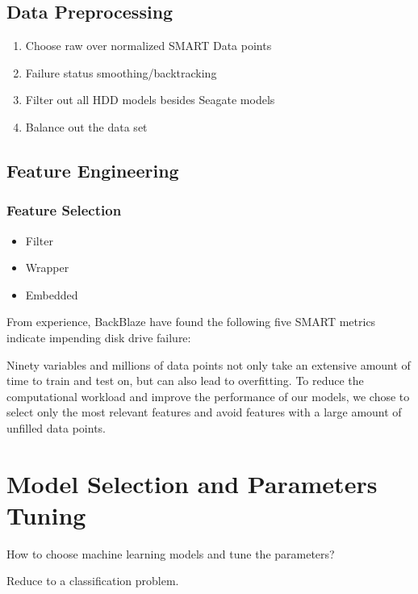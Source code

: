 \documentclass[12pt,a4paper,english]{amsart}
\begin{document}
\subsection{Data Preprocessing}


\begin{enumerate}
	\item Choose raw over normalized SMART Data points
	\item Failure status smoothing/backtracking
	\item Filter out all HDD models besides Seagate models
	\item Balance out the data set
\end{enumerate}

\subsection{Feature Engineering}

\subsubsection*{Feature Selection}

\begin{itemize}
	\item Filter
	\item Wrapper
	\item Embedded
\end{itemize}

From experience, BackBlaze have found the following five SMART metrics indicate impending disk drive failure:


Ninety variables and millions of data points not only take an extensive amount of time to train and test on, but can also lead to overfitting. To reduce the computational workload and improve the performance of our models, we chose   to   select   only   the   most   relevant   features   and   avoid   features   with   a   large   amount   of   unfilled   data   points.
%
\section{Model Selection and Parameters Tuning}

How to choose machine learning models and tune the parameters?

Reduce to a classification problem.
\end{document}
